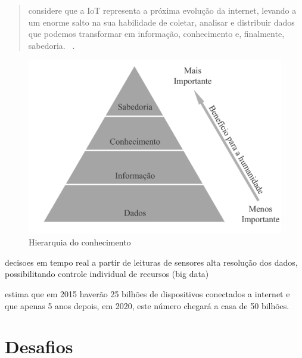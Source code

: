\documentclass[twoside,english,brazilian]{UNISINOSmonografia}
\begin{document}
	\begin{quote}
		considere que a IoT representa a próxima evolução da internet, 
		levando a um enorme salto na sua habilidade de coletar, analisar e 
		distribuir dados que podemos transformar em informação, 
		conhecimento e, finalmente, sabedoria.~
		\cite[p.~2]{Cisco2011}.
	\end{quote}
	
	\begin{figure}
		\caption{Hierarquia do conhecimento}
		\label{fig:wkid}
		\centering
		\begin{minipage}{.8\textwidth}
			\includegraphics[width=\textwidth]{wkid}
		\end{minipage}
	\end{figure}
	
	decisoes em tempo real a partir de leituras de sensores
	alta resolução dos dados, possibilitando controle individual de recursos 
	(big data)
	
	
	 estima que em 2015 haverão 25 bilhões de 
	dispositivos conectados a internet e que apenas 5 anos depois, em 
	2020, este número chegará a casa de 50 bilhões.

\section{Desafios}

\end{document}
